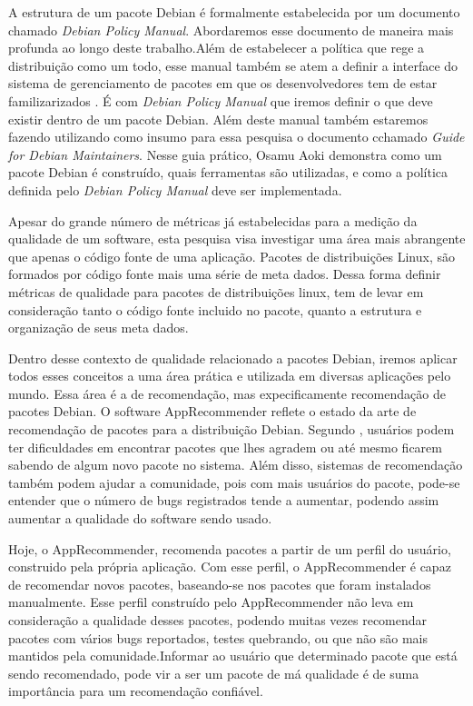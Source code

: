         A estrutura de um pacote Debian é formalmente estabelecida por um documento chamado \textit {Debian Policy Manual}. Abordaremos esse documento de maneira mais profunda ao longo deste trabalho.Além de estabelecer a política que rege a distribuição como um todo,  esse manual também se atem a definir a interface do sistema de gerenciamento de pacotes em que os desenvolvedores tem de estar familizarizados \cite{Guide}. É com \textit {Debian Policy Manual} que iremos definir o que deve existir dentro de um pacote Debian. Além deste manual também estaremos fazendo utilizando como insumo para essa pesquisa o documento cchamado \textit{Guide for Debian Maintainers}. Nesse guia prático, Osamu Aoki demonstra como um pacote Debian é construído, quais ferramentas são utilizadas, e como a política definida pelo \textit{Debian Policy Manual} deve ser implementada.
        
Apesar do grande número de métricas já estabelecidas para a medição da qualidade de um software,
esta pesquisa visa investigar uma área mais abrangente que apenas o código fonte de uma aplicação. Pacotes de distribuições Linux, são formados por código fonte mais uma série de meta dados. Dessa forma definir métricas de qualidade para pacotes de distribuições linux, tem de levar em consideração tanto o código fonte incluido no pacote, quanto a estrutura e organização de seus meta dados. 

Dentro desse contexto de qualidade relacionado a pacotes Debian, iremos aplicar todos esses conceitos a uma área prática e utilizada em diversas aplicações pelo mundo. Essa área é a de recomendação, mas expecificamente recomendação de pacotes Debian. O software AppRecommender reflete o estado da arte de recomendação de pacotes para a distribuição Debian.   Segundo \cite{Cavalcanti}, usuários podem ter dificuldades em encontrar pacotes que lhes agradem ou até mesmo ficarem sabendo de algum novo pacote no sistema. Além disso, sistemas de recomendação também podem ajudar a comunidade, pois com mais usuários do pacote, pode-se entender que o número de bugs registrados tende a aumentar, podendo assim aumentar a qualidade do software sendo usado.

Hoje, o AppRecommender, recomenda pacotes a partir de um perfil do usuário, construido pela própria aplicação. Com esse perfil, o AppRecommender é capaz de recomendar novos pacotes, baseando-se nos pacotes que foram instalados manualmente. Esse perfil construído pelo AppRecommender não leva em consideração a qualidade desses pacotes, podendo muitas vezes recomendar pacotes com vários bugs reportados, testes quebrando, ou que não são mais mantidos pela comunidade.Informar ao usuário que determinado pacote que está sendo recomendado, pode vir a ser um pacote de má qualidade é de suma importância para um recomendação confiável.
